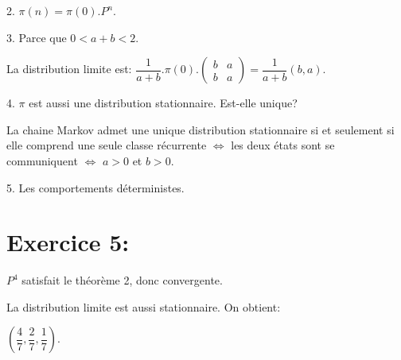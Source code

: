 \documentclass[a4paper,twoside,12pt]{article}
\begin{document}
2. $\pi(n) = \pi(0).P^n$.

3. Parce que $0 < a+b < 2$.

La distribution limite est: $\dfrac{1}{a+b}.\pi(0).\left(\begin{array}{cc}
    b & a\\
    b & a
\end{array}\right) = \dfrac{1}{a+b}(b, a)$.

4. $\pi$ est aussi une distribution stationnaire. Est-elle unique?

La chaine Markov admet une unique distribution stationnaire si et seulement si elle comprend une seule classe récurrente $\Leftrightarrow$ les deux états sont se communiquent $\Leftrightarrow$ $a > 0$ et $b > 0$.

5. Les comportements déterministes.

\section{Exercice 5:}
$P^4$ satisfait le théorème 2, donc convergente.

La distribution limite est aussi stationnaire. On obtient:

$\left(\dfrac{4}{7}, \dfrac{2}{7}, \dfrac{1}{7}\right)$.
\end{document}
